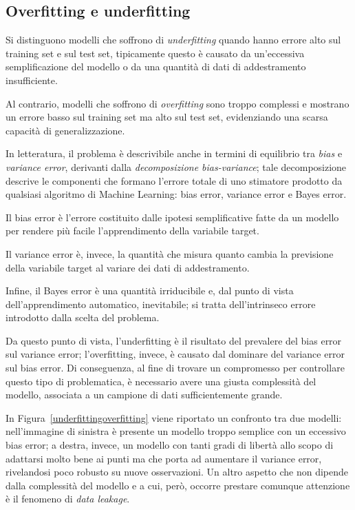 \documentclass[12pt]{report}
\theoremstyle{definition}
\begin{document}
\subsection{Overfitting e underfitting}
Si distinguono modelli che soffrono di \textit{underfitting} quando hanno errore alto sul training set e sul test set, tipicamente questo è causato da un'eccessiva semplificazione del modello o da una quantità di dati di addestramento insufficiente.

Al contrario, modelli che soffrono di \textit{overfitting} sono troppo complessi e mostrano un errore basso sul training set ma alto sul test set, evidenziando una scarsa capacità di generalizzazione.

In letteratura, il problema è descrivibile anche in termini di equilibrio tra \textit{bias} e \textit{variance error}, derivanti dalla \textit{decomposizione bias-variance}; tale decomposizione descrive le componenti che formano l'errore totale di uno stimatore prodotto da qualsiasi algoritmo di Machine Learning: bias error, variance error e Bayes error.

Il bias error è l'errore costituito dalle ipotesi semplificative fatte da un modello per rendere più facile l'apprendimento della variabile target.

Il variance error è, invece, la quantità che misura quanto cambia la previsione della variabile target al variare dei dati di addestramento.

Infine, il Bayes error è una quantità irriducibile e, dal punto di vista dell'apprendimento automatico, inevitabile; si tratta dell'intrinseco errore introdotto dalla scelta del problema.

Da questo punto di vista, l'underfitting è il risultato del prevalere del bias error sul variance error; l'overfitting, invece, è causato dal dominare del variance error sul bias error.
Di conseguenza, al fine di trovare un compromesso per controllare questo tipo di problematica, è necessario avere una giusta complessità del modello, associata a un campione di dati sufficientemente grande.

In Figura~\ref{underfittingoverfitting} viene riportato un confronto tra due modelli: nell'immagine di sinistra è presente un modello troppo semplice con un eccessivo bias error; a destra, invece, un modello con tanti gradi di libertà allo scopo di adattarsi molto bene ai punti ma che porta ad aumentare il variance error, rivelandosi poco robusto su nuove osservazioni. 
Un altro aspetto che non dipende dalla complessità del modello e a cui, però, occorre prestare comunque attenzione è il fenomeno di \textit{data leakage}.
\end{document}
